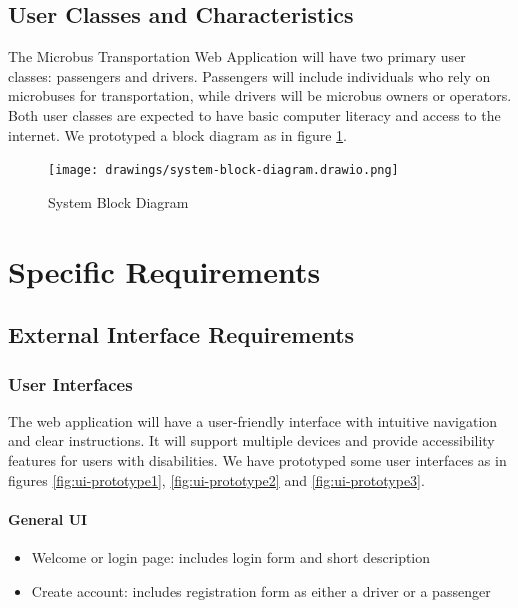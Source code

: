\documentclass{BusMateSRS}
\begin{document}
\section{User Classes and Characteristics}
The Microbus Transportation Web Application will have two primary user classes:
passengers and drivers. Passengers will include individuals who rely on
microbuses for transportation, while drivers will be microbus owners or
operators.
Both user classes are expected to have basic computer literacy and
access to the internet.
We prototyped a block diagram as in figure \ref{fig:system-block-diagram}.

\begin{figure}[ht!]
	\centering
	\texttt{[image: drawings/system-block-diagram.drawio.png]}
	\caption{System Block Diagram}
	\label{fig:system-block-diagram}
\end{figure}

\pagebreak

\chapter{Specific Requirements}
\section{External Interface Requirements}
\subsection{User Interfaces}
The web application will have a user-friendly interface with intuitive
navigation and clear instructions. It will support multiple devices and
provide accessibility features for users with disabilities.
We have prototyped some user interfaces as in figures
\ref{fig:ui-prototype1}, \ref{fig:ui-prototype2} and \ref{fig:ui-prototype3}.

\subsubsection{General UI}
\begin{itemize}
	\item Welcome or login page:
	      includes login form and short description
	\item Create account:
	      includes registration form as either a driver or a passenger
\end{itemize}
\end{document}
